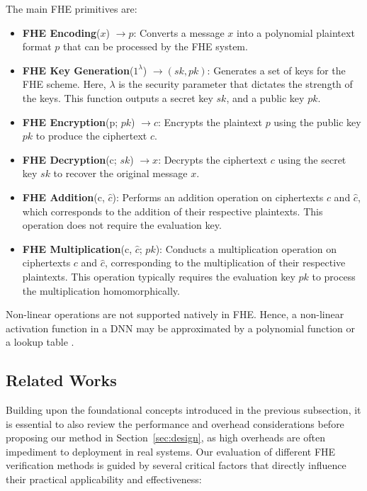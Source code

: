The main FHE primitives are:
\begin{itemize}
    \item \textbf{FHE Encoding}(\( x \)) \( \to p \): Converts a message \( x \) into a polynomial plaintext format \( p \) that can be processed by the FHE system.
    
    \item \textbf{FHE Key Generation}($1^\lambda$) \( \to (sk, pk) \): Generates a set of keys for the FHE scheme. Here, \( \lambda \) is the security parameter that dictates the strength of the keys. This function outputs a secret key \( sk \), and a public key \( pk \).
    
    \item \textbf{FHE Encryption}(p; \( pk \)) \( \to c \): Encrypts the plaintext \( p \) using the public key \( pk \) to produce the ciphertext \( c \).
    
    \item \textbf{FHE Decryption}(c; \( sk \)) \( \to x \): Decrypts the ciphertext \( c \) using the secret key \( sk \) to recover the original message \( x \).
    
    \item \textbf{FHE Addition}(c, \( \hat{c} \)): Performs an addition operation on ciphertexts \( c \) and \( \hat{c} \), which corresponds to the addition of their respective plaintexts. This operation does not require the evaluation key.
    
    \item \textbf{FHE Multiplication}(c, \( \hat{c} \); \( pk \)): Conducts a multiplication operation on ciphertexts \( c \) and \( \hat{c} \), corresponding to the multiplication of their respective plaintexts. This operation typically requires the evaluation key \( pk \) to process the multiplication homomorphically.
\end{itemize}

Non-linear operations are not supported natively in FHE. Hence, a non-linear activation function in a DNN may be approximated by a polynomial function \cite{cryptonet1,cryptonet2, cryptonet3} or a lookup table \cite{lut}.  

\subsection{Related Works} 

Building upon the foundational concepts introduced in the previous subsection, it is essential to also review the performance and overhead considerations before proposing our method in Section~\ref{sec:design}, as high overheads are often impediment to deployment in real systems. Our evaluation of different FHE verification methods is guided by several critical factors that directly influence their practical applicability and effectiveness:

